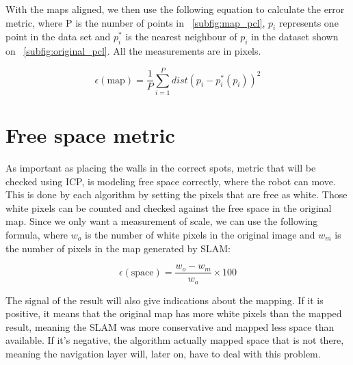 With the maps aligned, we then use the following equation to calculate the error metric, where P is the number of points in \figurename~\ref{subfig:map_pcl}, $p_i$ represents one point in the data set and $p_i^*$ is the nearest neighbour of $p_i$ in the dataset shown on \figurename~\ref{subfig:original_pcl}. All the measurements are in pixels.

\begin{equation}
\epsilon(\text{map}) = \frac{1}{P} \sum_{i=1}^P dist(p_i - p_i^*(p_i))^2
\end{equation}



\section{Free space metric} \label{sec:free_space}

As important as placing the walls in the correct spots, metric that will be checked using ICP, is modeling free space correctly, where the robot can move. This is done by each algorithm by setting the pixels that are free as white. Those white pixels can be counted and checked against the free space in the original map. Since we only want a measurement of scale, we can use the following formula, where $w_o$ is the number of white pixels in the original image and $w_m$ is the number of pixels in the map generated by SLAM:

\begin{equation}
\epsilon(\text{space}) = \frac{w_o - w_m}{w_o} \times 100
\end{equation}

The signal of the result will also give indications about the mapping. If it is positive, it means that the original map has more white pixels than the mapped result, meaning the SLAM was more conservative and mapped less space than available. If it's negative, the algorithm actually mapped space that is not there, meaning the navigation layer will, later on, have to deal with this problem.